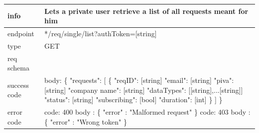 \documentclass[titlepage]{article}
\begin{document}
\vspace{\baselineskip}

\begin{tabularx}{\textwidth}{lX} \hline
    info & Lets a private user retrieve a list of all requests meant for him \\ \hline
    endpoint & */req/single/list?authToken=[string] \\ \hline
    type & GET \\ \hline
    req schema & \\ \hline
    success code & body: \{ \newline
    "requests": [ \newline
    \{ \newline
    "reqID": [string] \newline
    "email": [string] \newline
    "piva": [string] \newline
    "company name": [string] \newline
    "dataTypes": [[string],...[string]] \newline
    "status": [string] \newline
    "subscribing": [bool] \newline
    "duration": [int] \newline
    \} \newline
    ] \newline
    \} \\ \hline
    error code &
        code: 400 \newline
        body : \{ "error" : "Malformed request" \} \newline \newline
        code: 403 \newline
        body : \{ "error" : "Wrong token" \} \\ \hline
\end{tabularx}
		
\vspace{\baselineskip}
\end{document}
